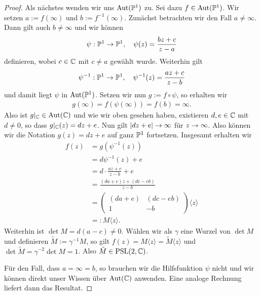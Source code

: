 \begin{proof}
  Als nächstes wenden wir uns $\Aut(\P^1)$ zu. Sei dazu $f \in
  \Aut(\P^1)$. Wir setzen $a:= f(\infty)$ und $b :=
  f^{-1}(\infty)$. Zunächst betrachten wir den Fall $a \neq
  \infty$. Dann gilt auch $b \neq \infty$ und wir können
  \[
  \psi: \P^1 \ra \P^1, \quad \psi(z) = \frac{bz + c}{z - a}
  \]
  definieren, wobei $c \in \C$ mit $c \neq a$ gewählt wurde. Weiterhin gilt
  \[
  \psi^{-1}: \P^1 \ra \P^1, \quad \psi^{-1}(z) = \frac{az +c}{z -b}
  \]
  und damit liegt $\psi$ in $\Aut(\P^1)$. Setzen wir nun $g := f \circ
  \psi$, so erhalten wir
  \begin{align*}
    g(\infty) = f(\psi(\infty)) = f(b) = \infty.
  \end{align*}
  Also ist $g|_\C \in \Aut(\C)$ und wie wir oben gesehen haben,
  existieren $d,e \in \C$ mit $d \neq 0$, so dass $g|_\C(z) = dz +
  e$. Nun gilt $|dz + e| \ra \infty$ für $z \ra \infty$. Also können
  wir die Notation $g(z) = dz+e$ auf ganz $\P^1$ fortsetzen. Insgesamt
  erhalten wir
  \begin{align*}
    f(z) & = g(\psi^{-1}(z)) \\
    & = d\psi^{-1}(z) + e \\
    & = d \cdot \frac{az + c}{z - b} + e \\
    & = \frac{(da + e) z + (dc - eb)}{z - b} \\
    & =
    \begin{pmatrix}
      (da + e) & (dc - eb) \\
      1 & -b
    \end{pmatrix}\langle z \rangle \\
    & =: M\langle z \rangle.
  \end{align*}
  Weiterhin ist $\det M = d( a-c) \neq 0$. Wählen wir als $\gamma$
  eine Wurzel von $\det M$ und definieren $\tilde M := \gamma^{-1} M$,
  so gilt $f(z) = M\langle z \rangle = \tilde M \langle z \rangle$ und
  $\det \tilde M = \gamma^{-2} \det M = 1$. Also $\tilde M \in
  \PSL(2, \C)$.

  Für den Fall, dass $a = \infty = b$, so brauchen wir die
  Hilfsfunktion $\psi$ nicht und wir können direkt unser Wissen über
  $\Aut(\C)$ anwenden. Eine analoge Rechnung liefert dann das
  Resultat.


\end{proof}
